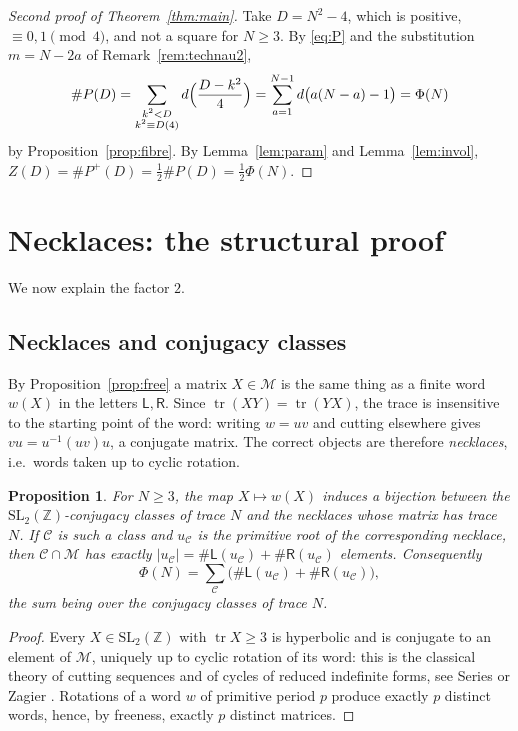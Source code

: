 \documentclass[11pt,reqno]{amsart}
\theoremstyle{plain}
\newtheorem{proposition}[theorem]{Proposition}
\theoremstyle{definition}
\newcommand{\Z}{\mathbb{Z}}
\newcommand{\Ll}{\mathsf{L}}
\newcommand{\Rr}{\mathsf{R}}
\newcommand{\Mon}{\mathcal{M}}
\newcommand{\tr}{\operatorname{tr}}
\newcommand{\SL}{\mathrm{SL}}
\begin{document}
\begin{proof}[Second proof of Theorem~\ref{thm:main}]
Take $D=N^2-4$, which is positive, $\equiv0,1\pmod4$, and not a square for $N\ge3$. By
\eqref{eq:P} and the substitution $m=N-2a$ of Remark~\ref{rem:technau2},
\[
  \#P(D)=\sum_{\substack{k^2<D\\ k^2\equiv D (4)}}d\Bigl(\frac{D-k^2}{4}\Bigr)
        =\sum_{a=1}^{N-1}d\bigl(a(N-a)-1\bigr)=\Phi(N)
\]
by Proposition~\ref{prop:fibre}. By Lemma~\ref{lem:param} and Lemma~\ref{lem:invol},
$Z(D)=\#P^{+}(D)=\frac12\#P(D)=\frac12\Phi(N)$.
\end{proof}

\section{Necklaces: the structural proof}\label{sec:necklace}

We now explain the factor $2$.

\subsection{Necklaces and conjugacy classes}
By Proposition~\ref{prop:free} a matrix $X\in\Mon$ is the same thing as a finite word
$w(X)$ in the letters $\Ll,\Rr$. Since $\tr(XY)=\tr(YX)$, the trace is insensitive to
the starting point of the word: writing $w=uv$ and cutting elsewhere gives
$vu=u^{-1}(uv)u$, a conjugate matrix. The correct objects are therefore \emph{necklaces},
i.e.\ words taken up to cyclic rotation.

\begin{proposition}\label{prop:necklace}
For $N\ge3$, the map $X\mapsto w(X)$ induces a bijection between the
$\SL_2(\Z)$-conjugacy classes of trace $N$ and the necklaces whose matrix has trace $N$.
If $\mathcal{C}$ is such a class and $u_\mathcal{C}$ is the primitive root of the
corresponding necklace, then $\mathcal{C}\cap\Mon$ has exactly
$|u_\mathcal{C}|=\#\Ll(u_\mathcal{C})+\#\Rr(u_\mathcal{C})$ elements. Consequently
\begin{equation}\label{eq:phiLR}
  \Phi(N)=\sum_{\mathcal{C}}\bigl(\#\Ll(u_\mathcal{C})+\#\Rr(u_\mathcal{C})\bigr),
\end{equation}
the sum being over the conjugacy classes of trace $N$.
\end{proposition}

\begin{proof}
Every $X\in\SL_2(\Z)$ with $\tr X\ge3$ is hyperbolic and is conjugate to an element of
$\Mon$, uniquely up to cyclic rotation of its word: this is the classical theory of
cutting sequences and of cycles of reduced indefinite forms, see Series \cite{Series} or
Zagier \cite[\S13]{Zagier}. Rotations of a word $w$ of primitive period $p$ produce
exactly $p$ distinct words, hence, by freeness, exactly $p$ distinct matrices.
\end{proof}
\end{document}
